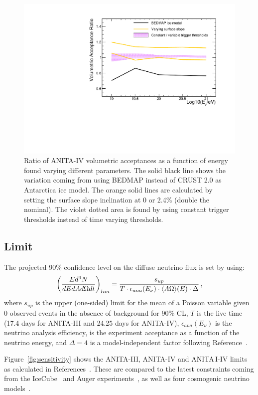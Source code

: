 \begin{figure}[!h]\centering
  \includegraphics[width=.45\linewidth]{./Figs/SystUncertaintiesForPaper.pdf}
  \caption{Ratio of ANITA-IV volumetric acceptances as a function of energy found varying different \icemc parameters. The solid black line shows the variation coming from using BEDMAP instead of CRUST 2.0 as Antarctica ice model.
  The orange solid lines are calculated by setting the surface slope inclination at 0 or 2.4\% (double the nominal).
  The violet dotted area is found by using constant trigger thresholds instead of time varying thresholds. }
  \label{fig:moreAcceptanceVariations}
\end{figure}

\subsection{Limit}
\label{subsec:limit}
The projected 90\% confidence level on the diffuse neutrino flux is set by using:
\begin{equation}
\left( \dfrac{Ed^4N}{dE dA d\Omega dt}\right)_{lim} =
\dfrac{s_{up}}{ T \cdot \epsilon_{ana} (E_\nu) \cdot \langle A\Omega\rangle(E) \cdot \Delta} \, ,
\end{equation}
\noindent
where
$s_{up}$ is the upper (one-sided) limit for the mean of a Poisson
variable given 0 observed events in the absence of background for 90\%
CL, 
$T$ is the live time 
(17.4 days for ANITA-III and 24.25 days for ANITA-IV), 
$\epsilon_{ana}(E_\nu)$ is the neutrino analysis efficiency,
\effarea is the experiment acceptance as a function of the neutrino
energy, and $\Delta=4$ is a model-independent factor following Reference~\cite{PhysRevD.73.082002}.


Figure~\ref{fig:sensitivity} shows the ANITA-III, ANITA-IV and ANITA\,I-IV limits as calculated in References~\cite{anita3cosmogenic,anita4cosmogenic}.
These are compared to the latest constraints coming from the IceCube~\cite{icecube2018} and Auger experiments~\cite{auger2017}, as well as
four cosmogenic neutrino models~\cite{kkss2002,takami2009,ahlers2012,kotera2010cosmogenic}.

